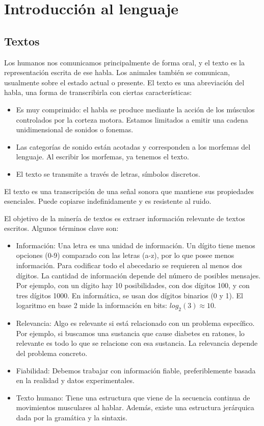 \chapter{Introducción al lenguaje}
\section{Textos}

Los humanos nos comunicamos principalmente de forma oral, y el texto es la representación escrita de ese habla. Los animales también se comunican, usualmente sobre el estado actual o presente. El texto es una abreviación del habla, una forma de transcribirla con ciertas características:
\begin{itemize}
\item Es muy comprimido: el habla se produce mediante la acción de los músculos controlados por la corteza motora. Estamos limitados a emitir una cadena unidimensional de sonidos o fonemas.
\item Las categorías de sonido están acotadas y corresponden a los morfemas del lenguaje. Al escribir los morfemas, ya tenemos el texto.
\item El texto se transmite a través de letras, símbolos discretos.
\end{itemize}

El texto es una transcripción de una señal sonora que mantiene sus propiedades esenciales. Puede copiarse indefinidamente y es resistente al ruido.

El objetivo de la minería de textos es extraer información relevante de textos escritos. Algunos términos clave son:
\begin{itemize}
\item Información: Una letra es una unidad de información. Un dígito tiene menos opciones (0-9) comparado con las letras (a-z), por lo que posee menos información. Para codificar todo el abecedario se requieren al menos dos dígitos. La cantidad de información depende del número de posibles mensajes. Por ejemplo, con un dígito hay 10 posibilidades, con dos dígitos 100, y con tres dígitos 1000. En informática, se usan dos dígitos binarios (0 y 1). El logaritmo en base 2 mide la información en bits: 
$log_2(3) \approx 10$.
\item Relevancia: Algo es relevante si está relacionado con un problema específico. Por ejemplo, si buscamos una sustancia que cause diabetes en ratones, lo relevante es todo lo que se relacione con esa sustancia. La relevancia depende del problema concreto.
\item Fiabilidad: Debemos trabajar con información fiable, preferiblemente basada en la realidad y datos experimentales.
\item Texto humano: Tiene una estructura que viene de la secuencia continua de movimientos musculares al hablar. Además, existe una estructura jerárquica dada por la gramática y la sintaxis.
\end{itemize}


